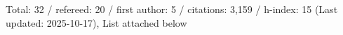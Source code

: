 Total: 32 / refereed: 20 / first author: 5 / citations: 3,159 / h-index: 15 (Last updated: 2025-10-17), List attached below